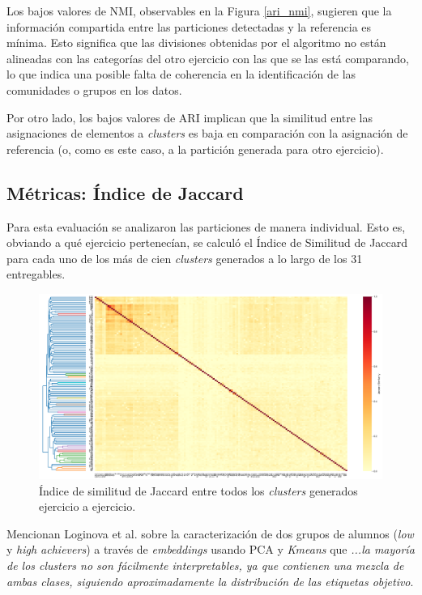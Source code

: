 \documentclass[11pt,a4paper,twoside,openany]{tesis}
\begin{document}
Los bajos valores de NMI, observables en la Figura \ref{ari_nmi}, sugieren que la información compartida entre las particiones detectadas y la referencia es mínima. Esto significa que las divisiones obtenidas por el algoritmo no están alineadas con las categorías del otro ejercicio con las que se las está comparando, lo que indica una posible falta de coherencia en la identificación de las comunidades o grupos en los datos.

Por otro lado, los bajos valores de ARI implican que la similitud entre las asignaciones de elementos a \emph{clusters} es baja en comparación con la asignación de referencia (o, como es este caso, a la partición generada para otro ejercicio).

\subsection{Métricas: Índice de Jaccard}
Para esta evaluación se analizaron las particiones de manera individual. Esto es, obviando a qué ejercicio pertenecían, se calculó el Índice de Similitud de Jaccard \cite{jaccard} para cada uno de los más de cien \emph{clusters} generados a lo largo de los 31 entregables.

\begin{figure}[H]
    \centering
    \includegraphics[width=1\textwidth]{imagenes/clusterxcluster.png}
    \caption{Índice de similitud de Jaccard entre todos los \emph{clusters} generados ejercicio a ejercicio.}
     \label{jaccard}
\end{figure}


Mencionan Loginova et al. sobre la caracterización de dos grupos de alumnos (\emph{low} y \emph{high achievers}) a través de \emph{embeddings} usando PCA y \emph{Kmeans} que \emph{...la mayoría de los clusters no son fácilmente interpretables, ya que contienen una mezcla de ambas clases, siguiendo aproximadamente la distribución de las etiquetas objetivo}\cite{loginova2021embedding}.
\end{document}
